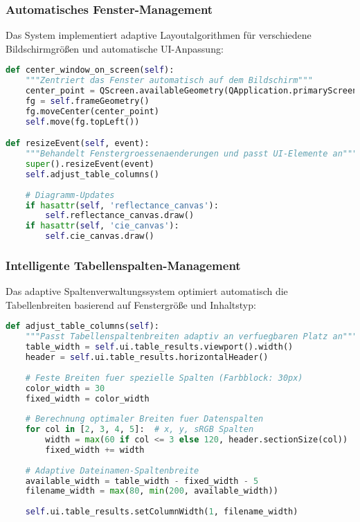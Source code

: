 \subsubsection{Automatisches Fenster-Management}

Das System implementiert adaptive Layoutalgorithmen für verschiedene Bildschirmgrößen und automatische UI-Anpassung:

\begin{lstlisting}[language=Python, caption=Responsive Fenster-Management]
def center_window_on_screen(self):
    """Zentriert das Fenster automatisch auf dem Bildschirm"""
    center_point = QScreen.availableGeometry(QApplication.primaryScreen()).center()
    fg = self.frameGeometry()
    fg.moveCenter(center_point)
    self.move(fg.topLeft())

def resizeEvent(self, event):
    """Behandelt Fenstergroessenaenderungen und passt UI-Elemente an"""
    super().resizeEvent(event)
    self.adjust_table_columns()
    
    # Diagramm-Updates
    if hasattr(self, 'reflectance_canvas'):
        self.reflectance_canvas.draw()
    if hasattr(self, 'cie_canvas'):
        self.cie_canvas.draw()
\end{lstlisting}

\subsubsection{Intelligente Tabellenspalten-Management}

Das adaptive Spaltenverwaltungssystem optimiert automatisch die Tabellenbreiten basierend auf Fenstergröße und Inhaltstyp:

\begin{lstlisting}[language=Python, caption=Adaptive Tabellenspalten-Anpassung]
def adjust_table_columns(self):
    """Passt Tabellenspaltenbreiten adaptiv an verfuegbaren Platz an"""
    table_width = self.ui.table_results.viewport().width()
    header = self.ui.table_results.horizontalHeader()
    
    # Feste Breiten fuer spezielle Spalten (Farbblock: 30px)
    color_width = 30
    fixed_width = color_width
    
    # Berechnung optimaler Breiten fuer Datenspalten
    for col in [2, 3, 4, 5]:  # x, y, sRGB Spalten
        width = max(60 if col <= 3 else 120, header.sectionSize(col))
        fixed_width += width
    
    # Adaptive Dateinamen-Spaltenbreite
    available_width = table_width - fixed_width - 5
    filename_width = max(80, min(200, available_width))
    
    self.ui.table_results.setColumnWidth(1, filename_width)
\end{lstlisting}

